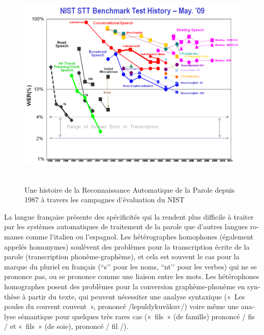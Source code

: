 \begin{french}
\begin{multicols}{2}
\begin{figure}[!ht]
\begin{center}
  \includegraphics[height=4.0in]{_media/french/french_pix8_speech_reco_nist.png}
  \caption{Une histoire de la Reconnaissance Automatique de la Parole depuis 1987 à travers les campagnes d{\mbox '}évaluation du NIST~\cite{speechreconist}}
  \label{fig:nistreco}
\end{center}
\end{figure}

La langue française présente des spécificités qui la rendent plus
difficile à traiter par les systèmes automatiques de traitement de la
parole que d{\mbox '}autres langues romanes comme l{\mbox '}italien ou l{\mbox '}espagnol. Les
hétérographes homophones (également appelés homonymes) soulèvent des
problèmes pour la transcription écrite de la parole (transcription
phonème-graphème), et cela est souvent le cas pour la marque du
pluriel en français (``s{\mbox '}{\mbox '} pour les noms, ``nt{\mbox '}{\mbox '} pour les verbes) qui
ne se prononce pas, ou se prononce comme une liaison entre les
mots. Les hétérophones homographes posent des problèmes pour la
conversion graphème-phonème en synthèse à partir du texte, qui peuvent
nécessiter une analyse syntaxique («~Les poules du couvent couvent~»,
prononcé /lepuldykuvãkuv/) voire même une analyse sémantique pour
quelques très rares cas («~fils~» (de famille) prononcé / fis / et
«~fils~» (de soie), prononcé / fil /).


\end{multicols}
\end{french}
